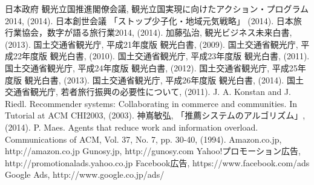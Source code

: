 
\begin{thebibliography}{report}

 日本政府 観光立国推進閣僚会議, 観光立国実現に向けたアクション・プログラム2014, (2014).
 日本創世会議 「ストップ少子化・地域元気戦略」 (2014).
 日本旅行業協会，数字が語る旅行業2014, (2014).
 加藤弘治, 観光ビジネス未来白書, (2013).
 国土交通省観光庁, 平成21年度版 観光白書, (2009).
 国土交通省観光庁, 平成22年度版 観光白書, (2010).
 国土交通省観光庁, 平成23年度版 観光白書, (2011).
 国土交通省観光庁, 平成24年度版 観光白書, (2012).
 国土交通省観光庁, 平成25年度版 観光白書, (2013).
 国土交通省観光庁, 平成26年度版 観光白書, (2014).
 国土交通省観光庁, 若者旅行振興の必要性について, (2011).
 J. A. Konstan and J. Riedl. Recommender systems: Collaborating in commerce and communities. In Tutorial at ACM CHI2003, (2003).
 神嶌敏弘, 「推薦システムのアルゴリズム」, (2014).
 P. Maes. Agents that reduce work and information overload. Communications of ACM, Vol. 37, No. 7, pp. 30-40, (1994).
 Amazon.co.jp, http://amazon.co.jp
 Gunosy.jp, http://gunosy.com
 Yahoo!プロモーション広告, http://promotionalads.yahoo.co.jp
 Facebook広告, https://www.facebook.com/ads
 Google Ads, http://www.google.co.jp/ads/ 


\end{thebibliography}

